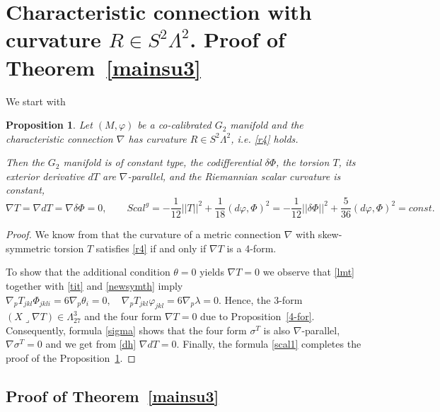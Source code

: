 \documentclass[10pt,british]{article}
\newtheorem{prop}[thrm]{Proposition}
\def\sb {{\nabla}}
\def\p{{\varphi}}
\def\ph{{\Phi}}
\begin{document}
\section{Characteristic connection with curvature $R\in S^2\Lambda^2$. Proof of Theorem~\ref{mainsu3}}
We start with  
\begin{prop}\label{mainsu}
Let $(M,\p)$ be  a co-calibrated $G_2$ manifold and the   characteristic  connection $\sb$   has curvature $R \in S^2\Lambda^2$, i.e. \eqref{r4} holds.


Then the $G_2$ manifold is of constant type, the codifferential $\delta\ph$, %
the torsion $T$,  its exterior derivative $dT$ are $\sb$-parallel, and the Riemannian scalar curvature is constant, $$\sb T=\sb dT=\sb\delta\ph=0, \qquad Scal^g=-\frac1{12}||T||^2+\frac1{18}(d\p,\ph)^2=-\frac1{12}||\delta\ph||^2+\frac5{36}(d\p,\ph)^2=const.$$
\end{prop}
\begin{proof} %
We know from \cite[Corollary~3.4]{I} that the curvature of a metric connection $\sb$ with skew-symmetric torsion $T$ satisfies \eqref{r4} if and only if $\sb T$ is a 4-form.

To show that the additional condition $\theta=0$ yields $\sb T=0$ we observe that \eqref{lmt} together with  \eqref{tit} and \eqref{newsymth} imply
$%
\sb_pT_{jkl}\Phi_{jkli}=6\sb_p\theta_i=0,\quad
\sb_pT_{jkl}\p_{jkl}=6\sb_p\lambda=0.
$ %
Hence, the 3-form $(X\lrcorner\sb T)\in \Lambda^3_{27}$ and the four form $\sb T=0$ due to Proposition~\ref{4-for}. Consequently, formula \eqref{sigma} shows that the four form $\sigma^T$ is also $\sb$-parallel, $\sb\sigma^T=0$ and we get from \eqref{dh} $\sb dT=0$. Finally, the formula \eqref{scal1}  completes the proof of the Proposition~\ref{mainsu}.
\end{proof}


\subsection{Proof of Theorem~\ref{mainsu3}}
\end{document}
